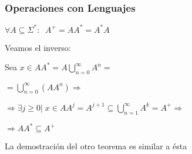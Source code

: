 \begin{frame}
  \frametitle{Operaciones con Lenguajes}
      \begin{teor}
			$\forall A \subseteq \Sigma^*: \; \; A^+ = AA^* = A^*A$
      \end{teor}

      Veamos el inverso:
			\pause
      \begin{demo}
					  {Sea $x \in AA^* = A  \displaystyle\bigcup_{n=0}^{\infty} A^n =$}

					  {$= \displaystyle\bigcup_{n=0}^{\infty} (AA^n) \Rightarrow$}

					  {$\Rightarrow \exists j \geq 0 | \; x \in AA^j = A^{j+1} \subseteq  \displaystyle\bigcup_{n=1}^{\infty} A^k = A^+ \Rightarrow$}

					  {$\Rightarrow AA^* \subseteq A^+$}

					  {La demostración del otro teorema es similar a ésta}
      \end{demo}
\end{frame}
